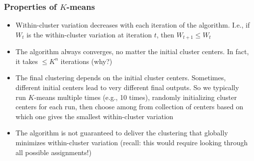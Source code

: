 \documentclass[mathserif]{beamer}
\def\R{\mathds{R}}
\def\red{\color[rgb]{0.8,0,0}}
\def\blue{\color[rgb]{0,0,0.8}}
\begin{document}
%
%

\begin{frame}
\frametitle{Properties of $K$-means}
\begin{itemize}
\item Within-cluster variation {\blue decreases}
with each iteration of the algorithm. I.e., if $W_t$ 
is the within-cluster variation at iteration $t$, 
then $W_{t+1} \leq W_t$ 
\item The algorithm {\blue always converges}, no
matter the initial cluster centers. In fact, it takes
$\leq K^n$ iterations (why?)
\item The final clustering {\blue depends on the initial}
cluster centers. Sometimes, different initial centers
lead to very different final outputs. 
So we typically run $K$-means {\blue multiple times} 
(e.g., 10 times),
randomly initializing cluster centers for each run,
then choose among from collection of centers 
based on which one gives the smallest 
within-cluster variation
\item The algorithm is {\blue not guaranteed} to deliver
the clustering that globally minimizes
within-cluster variation (recall: this would require  
looking through all possible assignments!)
\end{itemize}
\end{frame}
\end{document}
